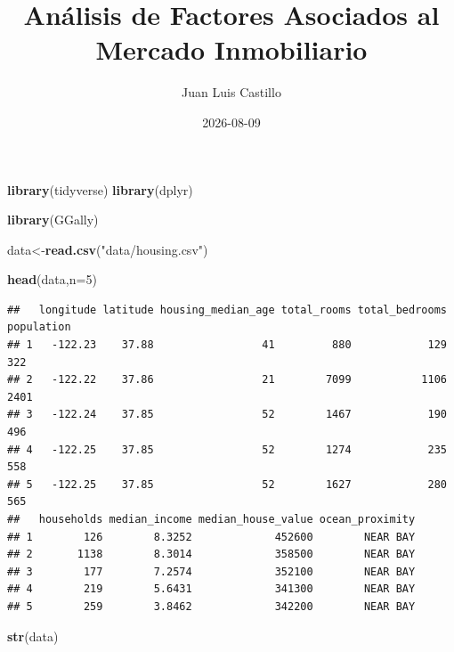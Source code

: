\documentclass[
]{book}
\title{Análisis de Factores Asociados al Mercado Inmobiliario}
\author{Juan Luis Castillo}
\date{2026-08-09}
\newenvironment{Shaded}{\begin{snugshade}}{\end{snugshade}}
\newcommand{\AttributeTok}[1]{\textcolor[rgb]{0.13,0.29,0.53}{#1}}
\newcommand{\DecValTok}[1]{\textcolor[rgb]{0.00,0.00,0.81}{#1}}
\newcommand{\FunctionTok}[1]{\textcolor[rgb]{0.13,0.29,0.53}{\textbf{#1}}}
\newcommand{\NormalTok}[1]{#1}
\newcommand{\OtherTok}[1]{\textcolor[rgb]{0.56,0.35,0.01}{#1}}
\newcommand{\StringTok}[1]{\textcolor[rgb]{0.31,0.60,0.02}{#1}}
\begin{document}
\maketitle

{
\setcounter{tocdepth}{1}
\tableofcontents
}
\begin{Shaded}
\begin{Highlighting}[]
\FunctionTok{library}\NormalTok{(tidyverse)}
\FunctionTok{library}\NormalTok{(dplyr)}

\FunctionTok{library}\NormalTok{(GGally)}
\end{Highlighting}
\end{Shaded}

\begin{Shaded}
\begin{Highlighting}[]
\NormalTok{data}\OtherTok{\textless{}{-}}\FunctionTok{read.csv}\NormalTok{(}\StringTok{"data/housing.csv"}\NormalTok{)}
\end{Highlighting}
\end{Shaded}

\begin{Shaded}
\begin{Highlighting}[]
\FunctionTok{head}\NormalTok{(data,}\AttributeTok{n=}\DecValTok{5}\NormalTok{)}
\end{Highlighting}
\end{Shaded}

\begin{verbatim}
##   longitude latitude housing_median_age total_rooms total_bedrooms population
## 1   -122.23    37.88                 41         880            129        322
## 2   -122.22    37.86                 21        7099           1106       2401
## 3   -122.24    37.85                 52        1467            190        496
## 4   -122.25    37.85                 52        1274            235        558
## 5   -122.25    37.85                 52        1627            280        565
##   households median_income median_house_value ocean_proximity
## 1        126        8.3252             452600        NEAR BAY
## 2       1138        8.3014             358500        NEAR BAY
## 3        177        7.2574             352100        NEAR BAY
## 4        219        5.6431             341300        NEAR BAY
## 5        259        3.8462             342200        NEAR BAY
\end{verbatim}

\begin{Shaded}
\begin{Highlighting}[]
\FunctionTok{str}\NormalTok{(data)}
\end{Highlighting}
\end{Shaded}
\end{document}
